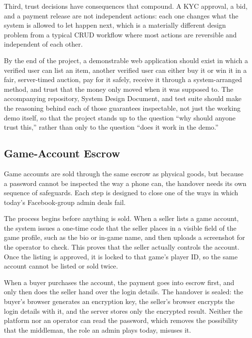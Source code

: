 \documentclass[11pt,a4paper]{article}
\begin{document}
Third, trust decisions have consequences that compound. A KYC approval, a bid, and a payment release
are not independent actions: each one changes what the system is allowed to let happen next, which is a
materially different design problem from a typical CRUD workflow where most actions are reversible and
independent of each other.

By the end of the project, a demonstrable web application should exist in which a verified user can
list an item, another verified user can either buy it or win it in a fair, server-timed auction, pay
for it safely, receive it through a system-arranged method, and trust that the money only moved when it
was supposed to. The accompanying repository, System Design Document, and test suite should make the
reasoning behind each of those guarantees inspectable, not just the working demo itself, so that the
project stands up to the question ``why should anyone trust this,'' rather than only to the question
``does it work in the demo.''

\subsection{Game-Account Escrow}
\label{sec:game}

Game accounts are sold through the same escrow as physical goods, but because a password cannot be
inspected the way a phone can, the handover needs its own sequence of safeguards. Each step is designed
to close one of the ways in which today's Facebook-group admin deals fail.

The process begins before anything is sold. When a seller lists a game account, the system issues a
one-time code that the seller places in a visible field of the game profile, such as the bio or in-game
name, and then uploads a screenshot for the operator to check. This proves that the seller actually
controls the account. Once the listing is approved, it is locked to that game's player ID, so the same
account cannot be listed or sold twice.

When a buyer purchases the account, the payment goes into escrow first, and only then does the seller
hand over the login details. The handover is sealed: the buyer's browser generates an encryption key,
the seller's browser encrypts the login details with it, and the server stores only the encrypted
result. Neither the platform nor an operator can read the password, which removes the possibility that
the middleman, the role an admin plays today, misuses it.
\end{document}
